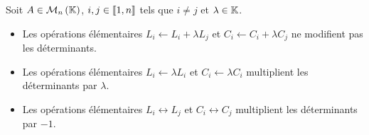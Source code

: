 \documentclass{magnolia}
\begin{document}


\begin{proposition}
Soit $A\in\mathcal{M}_{n}\left(\mathbb{K}\right)$, $i,j\in\left\llbracket 1,n\right\rrbracket$ tels que $i\neq j$ et $\lambda\in\mathbb{K}$.
\begin{itemize}
\item Les opérations élémentaires $L_i \gets L_i + \lambda L_j$ et $C_i\gets C_i+\lambda C_j$
  ne modifient pas les déterminants.
\item Les opérations élémentaires $L_i \gets \lambda L_i$ et $C_i\gets \lambda C_i$ multiplient
  les déterminants par $\lambda$.
\item Les opérations élémentaires $L_i \leftrightarrow L_j$ et $C_i \leftrightarrow C_j$ multiplient
  les déterminants par $-1$.
\end{itemize}
\end{proposition}
\end{document}

